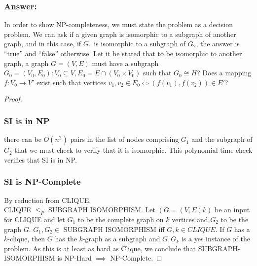 \documentclass[titlepage]{article}\usepackage[]{graphicx}\usepackage[]{color}
\begin{document}
  \subsubsection{Answer:}
  In order to show NP-completeness, we must state the problem as a decision
  problem. We can ask if a given graph is isomorphic to a subgraph of another
  graph, and in this case, if $G_1$ is isomorphic to a subgraph of $G_2$, the
  answer is ``true'' and ``false'' otherwise. 
  Let it be stated that to be isomorphic to another graph, a graph $G = (V,E)$
  must have a subgraph $G_0 = (V_0, E_0) : V_0 \subseteq V, E_0 =
  E\cap(V_0\times V_0)$ such that $G_0 \cong H$? Does a mapping $f: V_0 \to V'$
  exist such that vertices $v_1, v_2 \in E_0 \Leftrightarrow (f(v_1), f(v_2))
  \in E'$?
  \begin{proof}
    \subsubsection{SI is in NP}
    there can be $O(n^2)$ pairs in the list of nodes comprising $G_1$ and the
    subgraph of $G_2$ that we must check to verify that it is isomorphic. This
    polynomial time check verifies that SI is in NP.
    \subsubsection{SI is NP-Complete}
    By reduction from CLIQUE. \\
    CLIQUE $\leq_P$ SUBGRAPH ISOMORPHISM. Let $(G = (V,E)k)$ be an input for
    CLIQUE and let $G_1$ to be the complete graph on $k$ vertices and $G_2$ to
    be the graph $G$. $G_1,G_2 \in$ SUBGRAPH ISOMORPHISM iff $G,k \in CLIQUE$.
    If $G$ has a $k$-clique, then $G$ has the $k$-graph as a subgraph and
    $G,G_k$ is a yes instance of the problem. As this is at least as hard as
    Clique, we conclude that SUBGRAPH-ISOMORPHISM is NP-Hard $\implies$ NP-Complete.
  \end{proof}
\end{document}
